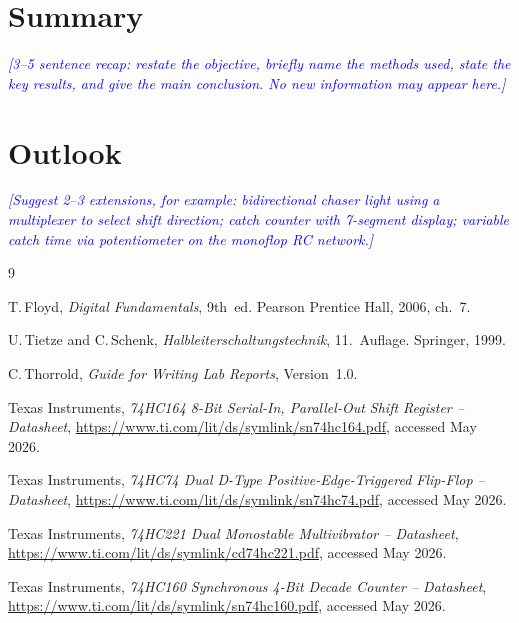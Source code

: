 \documentclass[12pt, a4paper]{article}
\newcommand{\enter}[1]{\textcolor{blue}{\textit{[#1]}}}
\begin{document}
\section{Summary}

\enter{3--5 sentence recap: restate the objective, briefly name the methods used,
state the key results, and give the main conclusion. No new information may appear
here.}

\section{Outlook}

\enter{Suggest 2--3 extensions, for example: bidirectional chaser light using a
multiplexer to select shift direction; catch counter with 7-segment display;
variable catch time via potentiometer on the monoflop RC network.}

\begin{thebibliography}{9}

T.\,Floyd,
\textit{Digital Fundamentals}, 9th~ed.
Pearson Prentice Hall, 2006, ch.~7.

U.\,Tietze and C.\,Schenk,
\textit{Halbleiterschaltungstechnik}, 11.~Auflage.
Springer, 1999.

C.\,Thorrold,
\textit{Guide for Writing Lab Reports}, Version~1.0.

Texas Instruments,
\textit{74HC164 8-Bit Serial-In, Parallel-Out Shift Register -- Datasheet},
\url{https://www.ti.com/lit/ds/symlink/sn74hc164.pdf}, accessed May 2026.

Texas Instruments,
\textit{74HC74 Dual D-Type Positive-Edge-Triggered Flip-Flop -- Datasheet},
\url{https://www.ti.com/lit/ds/symlink/sn74hc74.pdf}, accessed May 2026.

Texas Instruments,
\textit{74HC221 Dual Monostable Multivibrator -- Datasheet},
\url{https://www.ti.com/lit/ds/symlink/cd74hc221.pdf}, accessed May 2026.

Texas Instruments,
\textit{74HC160 Synchronous 4-Bit Decade Counter -- Datasheet},
\url{https://www.ti.com/lit/ds/symlink/sn74hc160.pdf}, accessed May 2026.

\end{thebibliography}
\end{document}
